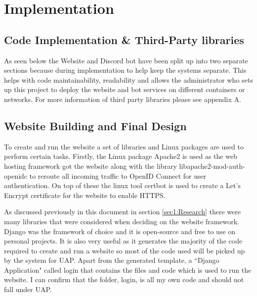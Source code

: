 \chapter{Implementation}

%
%

\section{Code Implementation \& Third-Party libraries}
As seen below the Website and Discord bot have been split up into two separate sections because during implementation to help keep the systems separate. This helps with code maintainability, readability and allows the administrator who sets up this project to deploy the website and bot services on different containers or networks. For more information of third party libraries please see appendix A.

\section{Website Building and Final Design}
To create and run the website a set of libraries and Linux packages are used to perform certain tasks. Firstly, the Linux package Apache2 \cite{apache2} is used as the web hosting framework got the website along with the library libapache2-mod-auth-openidc to reroute all incoming traffic to OpenID Connect \cite{OpenID} for user authentication. On top of these the linux tool certbot \cite{certbot} is used to create a Let's Encrypt certificate for the website to enable HTTPS. 

As discussed previously in this document in section \ref{sec1:Research} there were many libraries that were considered when deciding on the website framework. Django \cite{Django} was the framework of choice and it is open-source and free to use on personal projects. It is also very useful as it generates the majority of the code required to create and run a website so most of the code used will be picked up by the system for UAP. Apart from the generated template, a ``Django Application" called login that contains the files and code which is used to run the website. I can confirm that the folder, login, is all my own code and should not fall under UAP.

